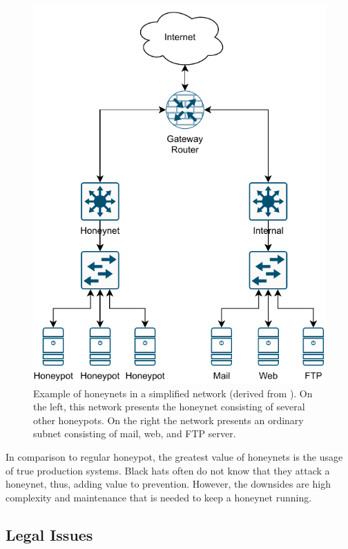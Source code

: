 \begin{figure}[ht]
    \centering
    \includegraphics{figures/honeynet-example.pdf}
    \caption[Example of honeynets in a simplified network]{Example of honeynets in a simplified network (derived from \cite{Spitzner2003}). On the left, this network presents the honeynet consisting of several other honeypots. On the right the network presents an ordinary subnet consisting of mail, web, and FTP server.}
    \label{fig:honeynet-example}
\end{figure}

In comparison to regular honeypot, the greatest value of honeynets is the usage of true production systems.
Black hats often do not know that they attack a honeynet, thus, adding value to prevention.
However, the downsides are high complexity and maintenance that is needed to keep a honeynet running. \cite{Spitzner2003}

\subsection{Legal Issues}

